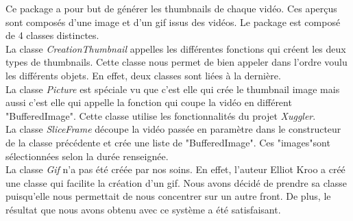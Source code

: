 Ce package a pour but de générer les thumbnails de chaque vidéo. Ces aperçus sont composés d'une image et d'un gif issus des vidéos. Le package est composé de 4 classes distinctes.\\
La classe \textit{CreationThumbnail} appelles les différentes fonctions qui créent les deux types de thumbnails. Cette classe nous permet de bien appeler dans l'ordre voulu les différents objets. En effet, deux classes sont liées à la dernière.\\
La classe \textit{Picture} est spéciale vu que c'est elle qui crée le thumbnail image mais aussi c'est elle qui appelle la fonction qui coupe la vidéo en différent "BufferedImage". Cette classe utilise les fonctionnalités du projet \textit{Xuggler}.\\
La classe \textit{SliceFrame} découpe la vidéo passée en paramètre dans le constructeur de la classe précédente et crée une liste de "BufferedImage". Ces "images"sont sélectionnées selon la durée renseignée.\\
La classe \textit{Gif} n'a pas été créée par nos soins. En effet, l'auteur Elliot Kroo a créé une classe qui facilite la création d'un gif. Nous avons décidé de prendre sa classe puisqu'elle nous permettait de nous concentrer sur un autre front. De plus, le résultat que nous avons obtenu avec ce système a été satisfaisant.